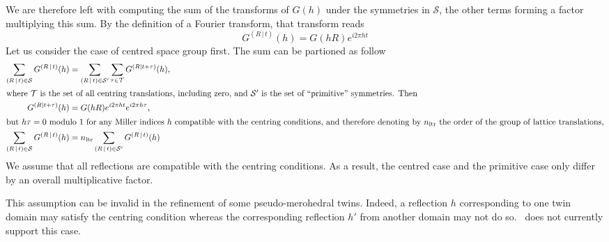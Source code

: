 \documentclass[pdf]{iucr}
\newcommand{\sym}[2]{\left( #1\,\vert\, #2 \right)}
\begin{document}
We are therefore left with computing the sum of the transforms of $G(h)$ under the symmetries in $\mathcal{S}$, the other terms forming a factor multiplying this sum. By the definition of a Fourier transform, that transform reads
\begin{equation}
G^{\sym{R}{t}}(h) = G(hR)e^{i 2\pi ht}
\label{eqn:transformofG}
\end{equation}
Let us consider the case of centred space group first. The sum can be partioned as follow
\begin{align}
 \sum_{\sym{R}{t} \in \mathcal{S}} G^{\sym{R}{t}}(h) &=  \sum_{\sym{R}{t} \in \mathcal{S}'} \sum_{\tau \in \cal{T}} G^{(R \mid t+\tau)}(h), \nonumber\\
\shortintertext{where $\cal{T}$ is the set of all centring translations, including zero, and $\mathcal{S}'$ is the set of ``primitive'' symmetries. Then}
G^{(R \mid t + \tau)}(h) &= G(hR) e^{i2\pi ht} e^{i2\pi h\tau}, \nonumber \\
\shortintertext{but $h\tau=0\ \text{modulo}\ 1$ for any Miller indices $h$ compatible with the centring conditions, and therefore denoting by $n_{\text{ltr}}$ the order of the group of lattice translations,}
\sum_{\sym{R}{t} \in \mathcal{S}} G^{\sym{R}{t}}(h) &= n_{\text{ltr}} \sum_{\sym{R}{t} \in \mathcal{S}'} G^{\sym{R}{t}}(h)
\end{align}
We assume that all reflections are compatible with the centring conditions. As a result,
the centred case and the primitive case only differ by an overall multiplicative factor.

This assumption can be invalid in the refinement of some pseudo-merohedral twins. Indeed, a reflection $h$ corresponding to one twin domain may satisfy the centring condition whereas the corresponding reflection $h'$ from another domain may not do so. \olexrefine\ does not currently support this case.   
\end{document}
